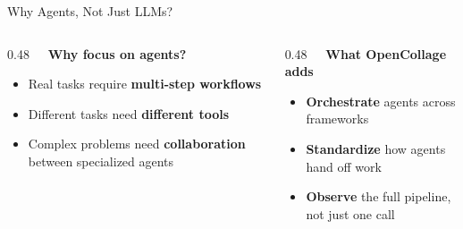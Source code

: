 \begin{frame}{Why Agents, Not Just LLMs?}
  \vspace{-0.1cm}

  \begin{columns}[T]
    \begin{column}{0.48\textwidth}
      \textbf{\ \ Why focus on agents?}
      \begin{itemize}
        \item Real tasks require \textbf{multi-step workflows}
        \item Different tasks need \textbf{different tools}
        \item Complex problems need \textbf{collaboration} between specialized agents
      \end{itemize}
    \end{column}
    \begin{column}{0.48\textwidth}
      \textbf{\ \ What OpenCollage adds}
      \begin{itemize}
        \item \textbf{Orchestrate} agents across frameworks
        \item \textbf{Standardize} how agents hand off work
        \item \textbf{Observe} the full pipeline, not just one call
      \end{itemize}
    \end{column}
  \end{columns}
\end{frame}
